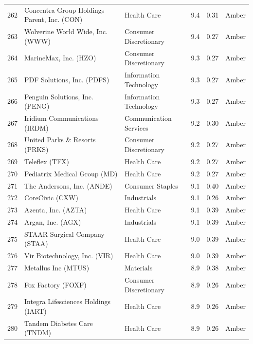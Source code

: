 \documentclass[11pt,a4paper]{article}
\begin{document}
{\begin{longtable}{r p{4.6cm} p{3cm} r r l}
262 & Concentra Group Holdings Parent, Inc. (CON) & Health Care & 9.4 & 0.31 & \cellcolor[HTML]{FFEB9C}Amber \\
263 & Wolverine World Wide, Inc. (WWW) & Consumer Discretionary & 9.4 & 0.27 & \cellcolor[HTML]{FFEB9C}Amber \\
264 & MarineMax, Inc. (HZO) & Consumer Discretionary & 9.3 & 0.27 & \cellcolor[HTML]{FFEB9C}Amber \\
265 & PDF Solutions, Inc. (PDFS) & Information Technology & 9.3 & 0.27 & \cellcolor[HTML]{FFEB9C}Amber \\
266 & Penguin Solutions, Inc. (PENG) & Information Technology & 9.3 & 0.27 & \cellcolor[HTML]{FFEB9C}Amber \\
267 & Iridium Communications (IRDM) & Communication Services & 9.2 & 0.30 & \cellcolor[HTML]{FFEB9C}Amber \\
268 & United Parks \& Resorts (PRKS) & Consumer Discretionary & 9.2 & 0.27 & \cellcolor[HTML]{FFEB9C}Amber \\
269 & Teleflex (TFX) & Health Care & 9.2 & 0.27 & \cellcolor[HTML]{FFEB9C}Amber \\
270 & Pediatrix Medical Group (MD) & Health Care & 9.2 & 0.27 & \cellcolor[HTML]{FFEB9C}Amber \\
271 & The Andersons, Inc. (ANDE) & Consumer Staples & 9.1 & 0.40 & \cellcolor[HTML]{FFEB9C}Amber \\
272 & CoreCivic (CXW) & Industrials & 9.1 & 0.26 & \cellcolor[HTML]{FFEB9C}Amber \\
273 & Azenta, Inc. (AZTA) & Health Care & 9.1 & 0.39 & \cellcolor[HTML]{FFEB9C}Amber \\
274 & Argan, Inc. (AGX) & Industrials & 9.1 & 0.39 & \cellcolor[HTML]{FFEB9C}Amber \\
275 & STAAR Surgical Company (STAA) & Health Care & 9.0 & 0.39 & \cellcolor[HTML]{FFEB9C}Amber \\
276 & Vir Biotechnology, Inc. (VIR) & Health Care & 9.0 & 0.39 & \cellcolor[HTML]{FFEB9C}Amber \\
277 & Metallus Inc (MTUS) & Materials & 8.9 & 0.38 & \cellcolor[HTML]{FFEB9C}Amber \\
278 & Fox Factory (FOXF) & Consumer Discretionary & 8.9 & 0.26 & \cellcolor[HTML]{FFEB9C}Amber \\
279 & Integra Lifesciences Holdings (IART) & Health Care & 8.9 & 0.26 & \cellcolor[HTML]{FFEB9C}Amber \\
280 & Tandem Diabetes Care (TNDM) & Health Care & 8.9 & 0.26 & \cellcolor[HTML]{FFEB9C}Amber \\

\end{longtable}}
\end{document}
